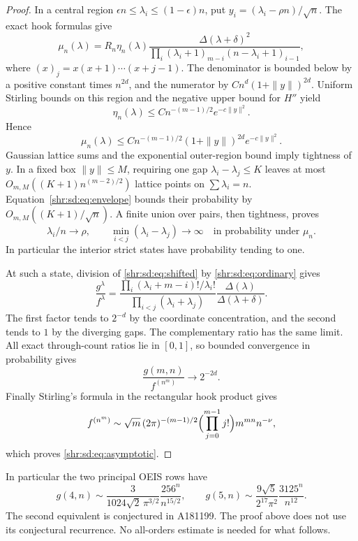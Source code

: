 \documentclass[11pt,letterpaper]{article}
\numberwithin{equation}{section}
\theoremstyle{definition}
\newcommand{\1}{\mathbf 1}
\newcommand{\D}{\Delta}
\begin{document}
\begin{proof}
In a central region $\epsilon n\le\lambda_i\le(1-\epsilon)n$, put $y_i=(\lambda_i-\rho n)/\sqrt n$. The exact hook formulas give
\begin{equation}\label{shr:sd:eq:murefine}
 \mu_n(\lambda)=R_n\eta_n(\lambda)
 \frac{\D(\lambda+\delta)^2}
 {\prod_i(\lambda_i+1)_{m-i}(n-\lambda_i+1)_{i-1}},
\end{equation}
where $(x)_j=x(x+1)\cdots(x+j-1)$. The denominator is bounded below by a positive constant times $n^{2d}$, and the numerator by $C n^d(1+\|y\|)^{2d}$. Uniform Stirling bounds on this region and the negative upper bound for $H''$ yield
\[
 \eta_n(\lambda)\le C n^{-(m-1)/2}e^{-c\|y\|^2}.
\]
Hence
\begin{equation}\label{shr:sd:eq:envelope}
 \mu_n(\lambda)\le C n^{-(m-1)/2}(1+\|y\|)^{2d}e^{-c\|y\|^2}.
\end{equation}
Gaussian lattice sums and the exponential outer-region bound imply tightness of $y$. In a fixed box $\|y\|\le M$, requiring one gap $\lambda_i-\lambda_j\le K$ leaves at most
$O_{m,M}((K+1)n^{(m-2)/2})$ lattice points on $\sum\lambda_i=n$. Equation~\eqref{shr:sd:eq:envelope} bounds their probability by $O_{m,M}((K+1)/\sqrt n)$. A finite union over pairs, then tightness, proves
\begin{equation}\label{shr:sd:eq:concentration}
 \lambda_i/n\longrightarrow\rho,\qquad
 \min_{i<j}(\lambda_i-\lambda_j)\longrightarrow\infty
 \quad\text{in probability under }\mu_n.
\end{equation}
In particular the interior strict states have probability tending to one.

At such a state, division of \eqref{shr:sd:eq:shifted} by \eqref{shr:sd:eq:ordinary} gives
\[
 \frac{g^\lambda}{f^\lambda}
 =\frac{\prod_i(\lambda_i+m-i)!/\lambda_i!}
        {\prod_{i<j}(\lambda_i+\lambda_j)}
       \frac{\D(\lambda)}{\D(\lambda+\delta)}.
\]
The first factor tends to $2^{-d}$ by the coordinate concentration, and the second tends to $1$ by the diverging gaps. The complementary ratio has the same limit. All exact through-count ratios lie in $[0,1]$, so bounded convergence in probability gives
\[
 \frac{g(m,n)}{f^{(n^m)}}\longrightarrow2^{-2d}.
\]
Finally Stirling's formula in the rectangular hook product gives
\[
 f^{(n^m)}\sim\sqrt m\,(2\pi)^{-(m-1)/2}
  \Bigl(\prod_{j=0}^{m-1}j!\Bigr)m^{mn}n^{-\nu},
\]
which proves \eqref{shr:sd:eq:asymptotic}.
\end{proof}

In particular the two principal OEIS rows have
\[
 g(4,n)\sim\frac{3}{1024\sqrt2\,\pi^{3/2}}
                      \frac{256^n}{n^{15/2}},\qquad
 g(5,n)\sim\frac{9\sqrt5}{2^{17}\pi^2}
                      \frac{3125^n}{n^{12}}.
\]
The second equivalent is conjectured in A181199. The proof above does not use its conjectural recurrence. No all-orders estimate is needed for what follows.
\end{document}
